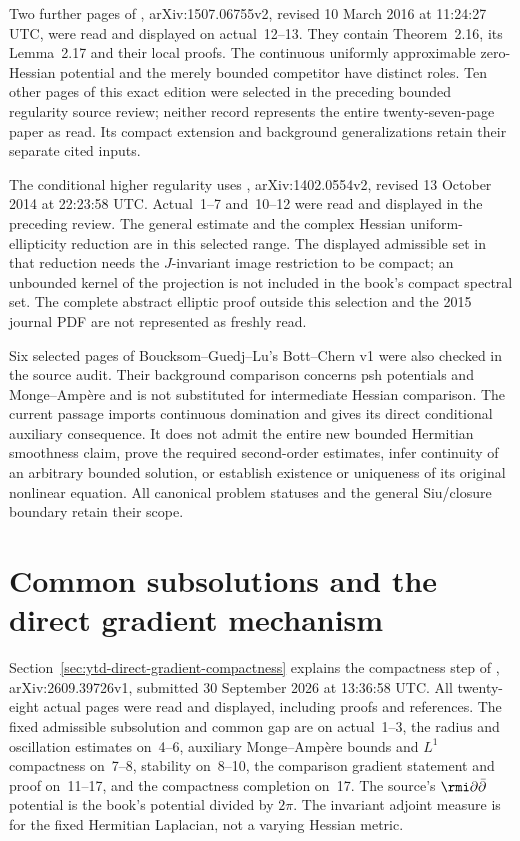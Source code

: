 Two further pages of \cite{KN16WeakHessianV2},
arXiv:\allowbreak 1507.06755v2, revised 10 March 2016 at
11:24:27 UTC, were read and displayed on actual~12--13.
They contain Theorem~2.16, its Lemma~2.17 and their local proofs.
The continuous uniformly approximable zero-Hessian potential and
the merely bounded competitor have distinct roles. Ten other
pages of this exact edition were selected in the preceding bounded
regularity source review; neither record represents the entire
twenty-seven-page paper as read. Its compact extension and
background generalizations retain their separate cited inputs.

The conditional higher regularity uses
\cite{TWWY14EstimatesV2}, arXiv:\allowbreak 1402.0554v2, revised
13 October 2014 at 22:23:58 UTC. Actual~1--7 and~10--12 were
read and displayed in the preceding review. The general estimate
and the complex Hessian uniform-ellipticity reduction are in this
selected range. The displayed admissible set in that reduction
needs the $J$-invariant image restriction to be compact; an
unbounded kernel of the projection is not included in the
book's compact spectral set. The complete abstract elliptic
proof outside this selection and the 2015 journal PDF are not
represented as freshly read.

Six selected pages of Boucksom--Guedj--Lu's Bott--Chern v1 were
also checked in the source audit. Their background comparison
concerns psh potentials and Monge--Amp\`ere and is not substituted
for intermediate Hessian comparison. The current passage imports
continuous domination and gives its direct conditional auxiliary
consequence. It does not admit the entire new bounded Hermitian
smoothness claim, prove the required second-order estimates, infer
continuity of an arbitrary bounded solution, or establish existence
or uniqueness of its original nonlinear equation. All canonical
problem statuses and the general Siu/closure boundary retain their scope.
\section{Common subsolutions and the direct gradient mechanism}
\label{sec:provenance-direct-gradient-compactness}

Section~\ref{sec:ytd-direct-gradient-compactness} explains the
compactness step of \cite{GuoSong26DirectGradientV1},
arXiv:\allowbreak 2609.39726v1, submitted 30 September 2026
at 13:36:58 UTC. All twenty-eight actual pages were read
and displayed, including proofs and references. The
fixed admissible subsolution and common gap are on
actual~1--3, the radius and oscillation estimates on~4--6,
auxiliary Monge--Amp\`ere bounds and $L^1$ compactness
on~7--8, stability on~8--10, the comparison gradient
statement and proof on~11--17, and the compactness
completion on~17. The source's $\rmi\partial\bar\partial$
potential is the book's potential divided by $2\pi$.
The invariant adjoint measure is for the fixed Hermitian
Laplacian, not a varying Hessian metric.


